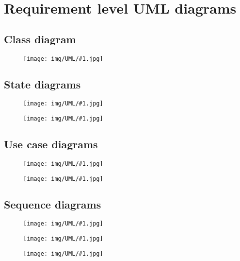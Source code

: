 \newcommand{\fetchUML}[4] {
  \begin{figure}[h!]
    \centering
    \hspace*{-#4cm}
    \texttt{[image: img/UML/\#1.jpg]}
    \caption{#2}
    \label{fig:#1}
  \end{figure}
}

\section{Requirement level UML diagrams}
\label{sec:graph}

  \subsection{Class diagram}
    \fetchUML
      {RequirementLevelClassDiagram}
      {}
      {1}           %
      {0}           %

  \clearpage
  \subsection{State diagrams}

    \fetchUML
      {UserStateDiagram}
      {}
      {0.6}           %
      {0}           %

    \fetchUML
      {ThirdPartyStateDiagram}
      {}
      {0.6}           %
      {0}           %

  \clearpage
  \subsection{Use case diagrams}

    \fetchUML
      {SignIn}
      {}
      {1}           %
      {2}           %

    \fetchUML
      {NormalBehaviour}
      {}
      {1}           %
      {2}           %

  \clearpage
  \subsection{Sequence diagrams}

    \fetchUML
      {Seq_UserRegistration}
      {}
      {.5}           %
      {0}           %

    \fetchUML
      {Seq_Ambulance}
      {}
      {.7}           %
      {0}           %

    \fetchUML
      {Seq_ThirdPartyRequest}
      {}
      {.7}           %
      {0}           %
